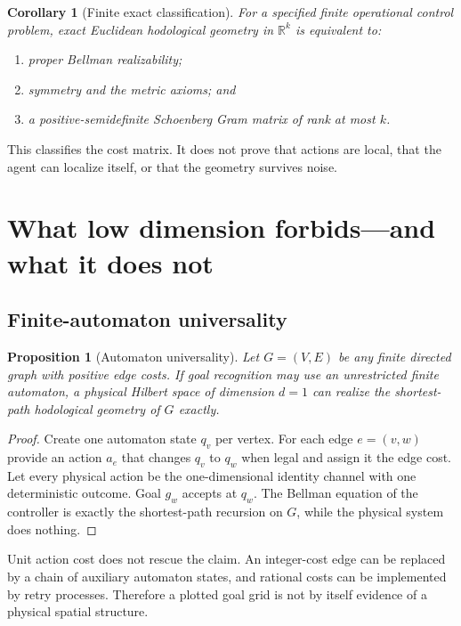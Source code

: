 \documentclass[11pt]{article}
\newtheorem{proposition}[theorem]{Proposition}
\newtheorem{corollary}[theorem]{Corollary}
\theoremstyle{definition}
\theoremstyle{remark}
\newcommand{\R}{\mathbb R}
\begin{document}
\begin{corollary}[Finite exact classification]
\label{cor:classification}
For a specified finite operational control problem, exact Euclidean
hodological geometry in $\R^k$ is equivalent to:
\begin{enumerate}
  \item proper Bellman realizability;
  \item symmetry and the metric axioms; and
  \item a positive-semidefinite Schoenberg Gram matrix of rank at most $k$.
\end{enumerate}
\end{corollary}

This classifies the cost matrix. It does not prove that actions are local,
that the agent can localize itself, or that the geometry survives noise.

\section{What low dimension forbids---and what it does not}
\label{sec:obstructions}

\subsection{Finite-automaton universality}

\begin{proposition}[Automaton universality]
\label{prop:automaton}
Let $G=(V,E)$ be any finite directed graph with positive edge costs. If goal
recognition may use an unrestricted finite automaton, a physical Hilbert space
of dimension $d=1$ can realize the shortest-path hodological geometry of
$G$ exactly.
\end{proposition}

\begin{proof}
Create one automaton state $q_v$ per vertex. For each edge $e=(v,w)$ provide
an action $a_e$ that changes $q_v$ to $q_w$ when legal and assign it the edge
cost. Let every physical action be the one-dimensional identity channel with
one deterministic outcome. Goal $g_w$ accepts at $q_w$. The Bellman equation
of the controller is exactly the shortest-path recursion on $G$, while the
physical system does nothing.
\end{proof}

Unit action cost does not rescue the claim. An integer-cost edge can be
replaced by a chain of auxiliary automaton states, and rational costs can be
implemented by retry processes. Therefore a plotted goal grid is not by itself
evidence of a physical spatial structure.
\end{document}
